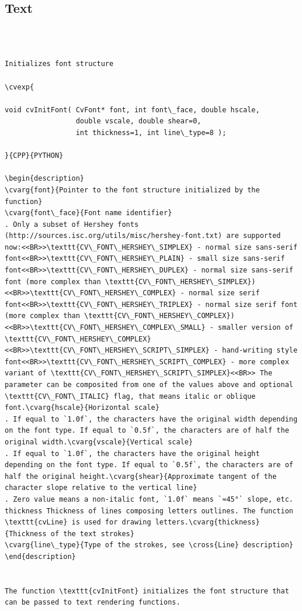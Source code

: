 \subsection{Text}
\begin{verbatim}


\end{verbatim}
\label{InitFont}
\begin{verbatim}

Initializes font structure

\cvexp{

void cvInitFont( CvFont* font, int font\_face, double hscale,
                 double vscale, double shear=0,
                 int thickness=1, int line\_type=8 );

}{CPP}{PYTHON}

\begin{description}
\cvarg{font}{Pointer to the font structure initialized by the function}
\cvarg{font\_face}{Font name identifier}
. Only a subset of Hershey fonts (http://sources.isc.org/utils/misc/hershey-font.txt) are supported now:<<BR>>\texttt{CV\_FONT\_HERSHEY\_SIMPLEX} - normal size sans-serif font<<BR>>\texttt{CV\_FONT\_HERSHEY\_PLAIN} - small size sans-serif font<<BR>>\texttt{CV\_FONT\_HERSHEY\_DUPLEX} - normal size sans-serif font (more complex than \texttt{CV\_FONT\_HERSHEY\_SIMPLEX})<<BR>>\texttt{CV\_FONT\_HERSHEY\_COMPLEX} - normal size serif font<<BR>>\texttt{CV\_FONT\_HERSHEY\_TRIPLEX} - normal size serif font (more complex than \texttt{CV\_FONT\_HERSHEY\_COMPLEX})<<BR>>\texttt{CV\_FONT\_HERSHEY\_COMPLEX\_SMALL} - smaller version of \texttt{CV\_FONT\_HERSHEY\_COMPLEX}<<BR>>\texttt{CV\_FONT\_HERSHEY\_SCRIPT\_SIMPLEX} - hand-writing style font<<BR>>\texttt{CV\_FONT\_HERSHEY\_SCRIPT\_COMPLEX} - more complex variant of \texttt{CV\_FONT\_HERSHEY\_SCRIPT\_SIMPLEX}<<BR>> The parameter can be composited from one of the values above and optional \texttt{CV\_FONT\_ITALIC} flag, that means italic or oblique font.\cvarg{hscale}{Horizontal scale}
. If equal to `1.0f`, the characters have the original width depending on the font type. If equal to `0.5f`, the characters are of half the original width.\cvarg{vscale}{Vertical scale}
. If equal to `1.0f`, the characters have the original height depending on the font type. If equal to `0.5f`, the characters are of half the original height.\cvarg{shear}{Approximate tangent of the character slope relative to the vertical line}
. Zero value means a non-italic font, `1.0f` means `≈45°` slope, etc. thickness Thickness of lines composing letters outlines. The function \texttt{cvLine} is used for drawing letters.\cvarg{thickness}{Thickness of the text strokes}
\cvarg{line\_type}{Type of the strokes, see \cross{Line} description}
\end{description}


The function \texttt{cvInitFont} initializes the font structure that can be passed to text rendering functions.


\end{verbatim}
